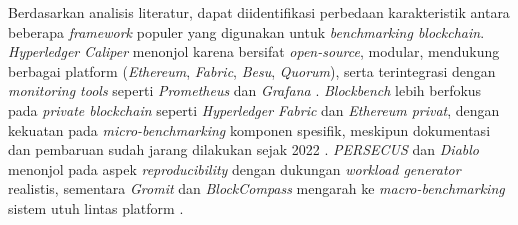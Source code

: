 Berdasarkan analisis literatur, dapat diidentifikasi perbedaan karakteristik antara beberapa \textit{framework} populer yang digunakan untuk \textit{benchmarking blockchain}. \textit{Hyperledger Caliper} menonjol karena bersifat \textit{open-source}, modular, mendukung berbagai platform (\textit{Ethereum}, \textit{Fabric}, \textit{Besu}, \textit{Quorum}), serta terintegrasi dengan \textit{monitoring tools} seperti \textit{Prometheus} dan \textit{Grafana} \cite{fan2020, zheng2019}. \textit{Blockbench} lebih berfokus pada \textit{private blockchain} seperti \textit{Hyperledger Fabric} dan \textit{Ethereum privat}, dengan kekuatan pada \textit{micro-benchmarking} komponen spesifik, meskipun dokumentasi dan pembaruan sudah jarang dilakukan sejak 2022 \cite{dinh2017}. \textit{PERSECUS} dan \textit{Diablo} menonjol pada aspek \textit{reproducibility} dengan dukungan \textit{workload generator} realistis, sementara \textit{Gromit} dan \textit{BlockCompass} mengarah ke \textit{macro-benchmarking} sistem utuh lintas platform \cite{beyer2024, martinez2022}.

